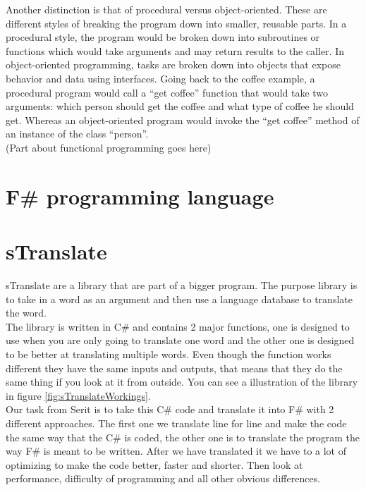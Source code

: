 \documentclass[12pt, a4paper]{article}
\begin{document}
Another distinction is that of procedural versus object-oriented. These are different styles of breaking the program down into smaller, reusable parts. In a procedural style, the program would be broken down into subroutines or functions which would take arguments and may return results to the caller. In object-oriented programming, tasks are broken down into objects that expose behavior and data using interfaces. Going back to the coffee example, a procedural program would call a “get coffee” function that would take two arguments: which person should get the coffee and what type of coffee he should get. Whereas an object-oriented program would invoke the “get coffee” method of an instance of the class “person”.\\

(Part about functional programming goes here)

\newpage
\section{F\# programming language}
\newpage

\section{sTranslate}
sTranslate are a library that are part of a bigger program. The purpose library is to take in a word as an argument and then use a language database to translate the word.\\

The library is written in C\# and contains 2 major functions, one is designed to use when you are only going to translate one word and the other one is designed to be better at translating multiple words. Even though the function works different they have the same inputs and outputs, that means that they do the same thing if you look at it from outside. You can see a illustration of the library in figure \ref{fig:sTranslateWorkings}.\\

Our task from Serit is to take this C\# code and translate it into F\# with 2 different approaches. The first one we translate line for line and make the code the same way that the C\# is coded, the other one is to translate the program the way F\# is meant to be written. After we have translated it we have to a lot of optimizing to make the code better, faster and shorter. Then look at performance, difficulty of programming and all other obvious differences.\\
\end{document}
